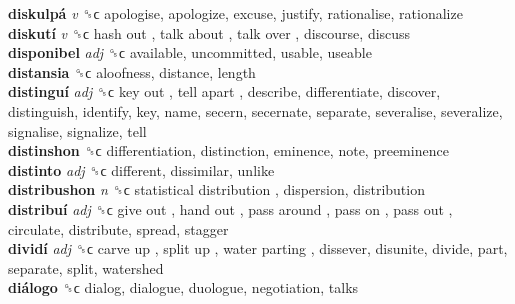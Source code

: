 \textbf{diskulpá} \emph{v}  ␝ϲ  apologise, apologize, excuse, justify, rationalise, rationalize  \\
\textbf{diskutí} \emph{v}  ␝ϲ   hash out ,  talk about ,  talk over , discourse, discuss  \\
\textbf{disponibel} \emph{adj}  ␝ϲ  available, uncommitted, usable, useable  \\
\textbf{distansia} ␝ϲ  aloofness, distance, length  \\
\textbf{distinguí} \emph{adj}  ␝ϲ   key out ,  tell apart , describe, differentiate, discover, distinguish, identify, key, name, secern, secernate, separate, severalise, severalize, signalise, signalize, tell  \\
\textbf{distinshon} ␝ϲ  differentiation, distinction, eminence, note, preeminence  \\
\textbf{distinto} \emph{adj}  ␝ϲ  different, dissimilar, unlike  \\
\textbf{distribushon} \emph{n}  ␝ϲ   statistical distribution , dispersion, distribution  \\
\textbf{distribuí} \emph{adj}  ␝ϲ   give out ,  hand out ,  pass around ,  pass on ,  pass out , circulate, distribute, spread, stagger  \\
\textbf{dividí} \emph{adj}  ␝ϲ   carve up ,  split up ,  water parting , dissever, disunite, divide, part, separate, split, watershed  \\
\textbf{diálogo} ␝ϲ  dialog, dialogue, duologue, negotiation, talks  \\
